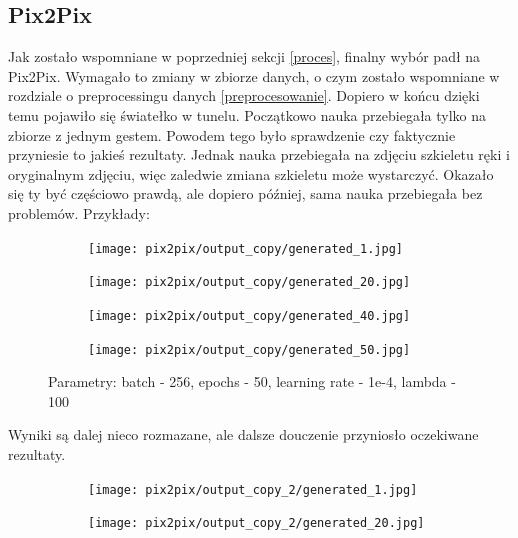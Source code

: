 \documentclass[12pt]{article}
\begin{document}
\begin{sloppypar}
{  \subsection{Pix2Pix}
  {
    Jak zostało wspomniane w poprzedniej sekcji \ref{proces}, finalny wybór padł na Pix2Pix. 
    Wymagało to zmiany w zbiorze danych, o czym zostało wspomniane w rozdziale o preprocessingu danych \ref{preprocesowanie}. 
    Dopiero w końcu dzięki temu pojawiło się światełko w tunelu. Początkowo nauka przebiegała tylko na zbiorze z jednym gestem. 
    Powodem tego było sprawdzenie czy faktycznie przyniesie to jakieś rezultaty. 
    Jednak nauka przebiegała na zdjęciu szkieletu ręki i oryginalnym zdjęciu, więc zaledwie zmiana szkieletu może wystarczyć. 
    Okazało się ty być częściowo prawdą, ale dopiero później, sama nauka przebiegała bez problemów.
    Przykłady:
    \begin{figure}
      \begin{subfigure}{.5\textwidth}
        \centering
        \texttt{[image: pix2pix/output\_copy/generated\_1.jpg]}
      \end{subfigure}%
      \begin{subfigure}{.5\textwidth}
        \centering
        \texttt{[image: pix2pix/output\_copy/generated\_20.jpg]}
      \end{subfigure}
      \begin{subfigure}{.5\textwidth}
        \centering
        \texttt{[image: pix2pix/output\_copy/generated\_40.jpg]}
      \end{subfigure}
      \begin{subfigure}{.5\textwidth}
        \centering
        \texttt{[image: pix2pix/output\_copy/generated\_50.jpg]}
      \end{subfigure}
      \caption{Parametry: batch - 256, epochs - 50, learning rate - 1e-4, lambda - 100}
    \end{figure}
    Wyniki są dalej nieco rozmazane, ale dalsze douczenie przyniosło oczekiwane rezultaty.
    \begin{figure}
      \begin{subfigure}{.5\textwidth}
        \centering
        \texttt{[image: pix2pix/output\_copy\_2/generated\_1.jpg]}
      \end{subfigure}%
      \begin{subfigure}{.5\textwidth}
        \centering
        \texttt{[image: pix2pix/output\_copy\_2/generated\_20.jpg]}
      \end{subfigure}
      \begin{subfigure}{.5\textwidth}

\end{subfigure}
\end{figure}}}
\end{sloppypar}
\end{document}
